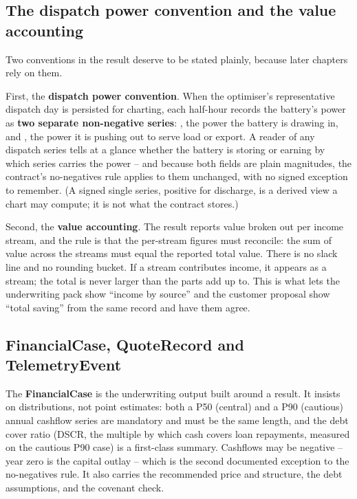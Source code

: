 \subsection{The dispatch power convention and the value accounting}

Two conventions in the result deserve to be stated plainly, because later chapters rely on them.

First, the \textbf{dispatch power convention}. When the optimiser's representative dispatch day is persisted for charting, each half-hour records the battery's power as \textbf{two separate non-negative series}: , the power the battery is drawing in, and , the power it is pushing out to serve load or export. A reader of any dispatch series tells at a glance whether the battery is storing or earning by which series carries the power -- and because both fields are plain magnitudes, the contract's no-negatives rule applies to them unchanged, with no signed exception to remember. (A signed single series, positive for discharge, is a derived view a chart may compute; it is not what the contract stores.)

Second, the \textbf{value accounting}. The result reports value broken out per income stream, and the rule is that the per-stream figures must reconcile: the sum of value across the streams must equal the reported total value. There is no slack line and no rounding bucket. If a stream contributes income, it appears as a stream; the total is never larger than the parts add up to. This is what lets the underwriting pack show ``income by source'' and the customer proposal show ``total saving'' from the same record and have them agree.

\subsection{FinancialCase, QuoteRecord and TelemetryEvent}

The \textbf{FinancialCase} is the underwriting output built around a result. It insists on distributions, not point estimates: both a P50 (central) and a P90 (cautious) annual cashflow series are mandatory and must be the same length, and the debt cover ratio (DSCR, the multiple by which cash covers loan repayments, measured on the cautious P90 case) is a first-class summary. Cashflows may be negative -- year zero is the capital outlay -- which is the second documented exception to the no-negatives rule. It also carries the recommended price and structure, the debt assumptions, and the covenant check.

